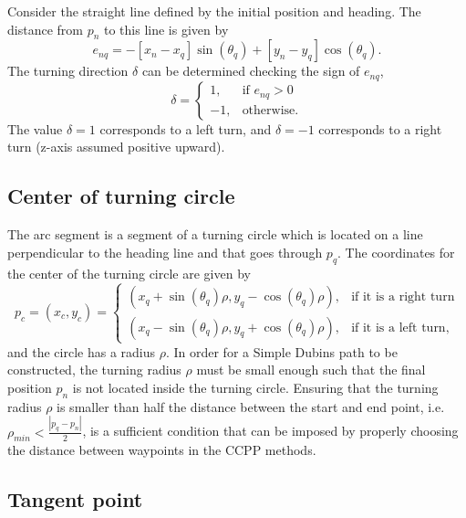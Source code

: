 Consider the straight line defined by the initial position and heading. The distance from $p_n$ to this line is given by 
\begin{equation}
	e_{nq} = -[x_n - x_q]\sin(\theta_q) + [y_n - y_q]\cos(\theta_q).
\end{equation}
The turning direction $\delta$ can be determined checking the sign of $e_{nq}$, 
\begin{equation}
\delta = 
\begin{cases}
1, & \text{if } e_{nq} > 0 \\
-1, & \text{otherwise.}
\end{cases}
\end{equation}
The value $\delta = 1$ corresponds to a left turn, and $\delta = -1$ corresponds to a right turn (z-axis assumed positive upward).

\subsection{Center of turning circle}

The arc segment is a segment of a turning circle which is located on a line perpendicular to the heading line and that goes through $p_q$. The coordinates for the center of the turning circle are given by
\begin{equation}
p_c = (x_c, y_c) = 
\begin{cases}
(x_q + \sin(\theta_q)\rho, y_q - \cos(\theta_q)\rho), & \text{if it is a right turn}  \\
(x_q - \sin(\theta_q)\rho, y_q + \cos(\theta_q)\rho), & \text{if it is a left turn,} 
\end{cases}
\end{equation}
and the circle has a radius $\rho$. In order for a Simple Dubins path to be constructed, the turning radius $\rho$ must be small enough such that the final position $p_n$ is not located inside the turning circle. Ensuring that the turning radius $\rho$ is smaller than half the distance between the start and end point, i.e. $\rho_{min} < \frac{|p_q - p_n|}{2}$, is a sufficient condition that can be imposed by properly choosing the distance between waypoints in the CCPP methods.

\subsection{Tangent point}

